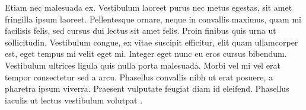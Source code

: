\documentclass[12pt]{report}
\renewcommand{\cite}{\supercite}
\begin{document}
Etiam nec malesuada ex. Vestibulum laoreet purus nec metus egestas, sit amet fringilla ipsum laoreet. Pellentesque ornare, neque in convallis maximus, quam mi facilisis felis, sed cursus dui lectus sit amet felis. Proin finibus quis urna ut sollicitudin. Vestibulum congue, ex vitae suscipit efficitur, elit quam ullamcorper est, eget tempus mi velit eget mi. Integer eget nunc eu eros cursus bibendum. Vestibulum ultrices ligula quis nulla porta malesuada. Morbi vel mi vel erat tempor consectetur sed a arcu. Phasellus convallis nibh ut erat posuere, a pharetra ipsum viverra. Praesent vulputate feugiat diam id eleifend. Phasellus iaculis ut lectus vestibulum volutpat \cite{amjad_value_2020}.

\newpage
\printbibliography %
\thispagestyle{empty}

\appendix
\end{document}
